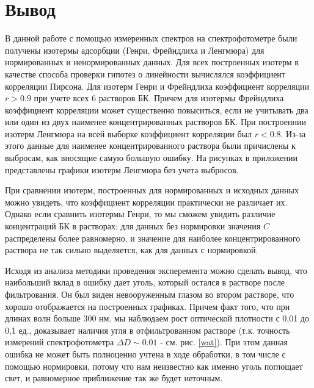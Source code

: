 \documentclass[a4paper,12pt]{article} %
\begin{document}
\section*{Вывод}
В данной работе с помощью измеренных спектров на спектрофотометре были получены изотермы адсорбции (Генри, Фрейндлиха и Ленгмюра) для нормированных и ненормированных данных. Для всех построенных изотерм в качестве способа проверки гипотез о линейности вычислялся коэффициент корреляции Пирсона. Для изотерм Генри и Фрейндлиха коэффициент корреляции $r > 0.9$ при учете всех 6 растворов БК. Причем для изотермы Фрейндлиха коэффициент корреляции может существенно повыситься, если не учитывать два или один из двух наименее концентрированных растворов БК. При построеннии изотерм Ленгмюра на всей выборке коэффициент корреляции был $r < 0.8$. Из-за этого данные для наименее концентрированного раствора были причислены к выбросам, как вносящие самую большую ошибку. На рисунках в приложении представлены графики изотерм Ленгмюра без учета выбросов.
\par
При сравнении изотерм, построенных для нормированных и исходных данных можно увидеть, что коэффициент корреляции практически не различает их. Однако если сравнить изотермы Генри, то мы сможем увидить различие концентраций БК в растворах: для данных без нормировки значения $C$ распределены более равномерно, и значение для наиболее концентрированного раствора не так сильно выделяется, как для данных с нормировкой.
\par
Исходя из анализа методики проведения эксперемента можно сделать вывод, что наибольший вклад в ошибку дает уголь, который остался в растворе после фильтрования. Он был виден невооруженным глазом во втором растворе, что хорошо отображается на построенных графиках. Причем факт того, что при длинах волн больше 300 нм. мы наблюдаем рост оптической плотности с 0,01 до 0,1 ед., доказывает наличия угля в отфильтрованном растворе (т.к. точность измерений спектрофотометра $\Delta D \sim 0.01 $ - см. рис. \ref{wat}). При этом данная ошибка не может быть полноценно учтена в ходе обработки, в том числе с помощью нормировки, потому что нам неизвестно как именно уголь поглощает свет, и равномерное приближение так же будет неточным. 
\end{document}
